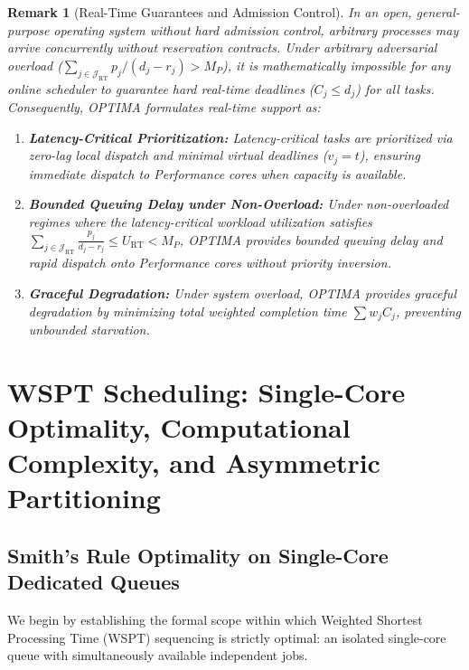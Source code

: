\documentclass[conference]{IEEEtran}
\newtheorem{remark}{Remark}
\begin{document}
\begin{remark}[Real-Time Guarantees and Admission Control]
\label{rem:realtime_softening}
In an open, general-purpose operating system without hard admission control, arbitrary processes may arrive concurrently without reservation contracts. Under arbitrary adversarial overload ($\sum_{j \in \mathcal{J}_{\mathrm{RT}}} p_j / (d_j - r_j) > M_P$), it is mathematically impossible for any online scheduler to guarantee hard real-time deadlines ($C_j \le d_j$) for all tasks. Consequently, OPTIMA formulates real-time support as:
\begin{enumerate}
    \item \textbf{Latency-Critical Prioritization:} Latency-critical tasks are prioritized via zero-lag local dispatch and minimal virtual deadlines ($v_j = t$), ensuring immediate dispatch to Performance cores when capacity is available.
    \item \textbf{Bounded Queuing Delay under Non-Overload:} Under non-overloaded regimes where the latency-critical workload utilization satisfies $\sum_{j \in \mathcal{J}_{\mathrm{RT}}} \frac{p_j}{d_j - r_j} \le U_{\mathrm{RT}} < M_P$, OPTIMA provides bounded queuing delay and rapid dispatch onto Performance cores without priority inversion.
    \item \textbf{Graceful Degradation:} Under system overload, OPTIMA provides graceful degradation by minimizing total weighted completion time $\sum w_j C_j$, preventing unbounded starvation.
\end{enumerate}
\end{remark}

\section{WSPT Scheduling: Single-Core Optimality, Computational Complexity, and Asymmetric Partitioning}
\label{sec:theorem1}

\subsection{Smith's Rule Optimality on Single-Core Dedicated Queues}
We begin by establishing the formal scope within which Weighted Shortest Processing Time (WSPT) sequencing is strictly optimal: an isolated single-core queue with simultaneously available independent jobs.
\end{document}
